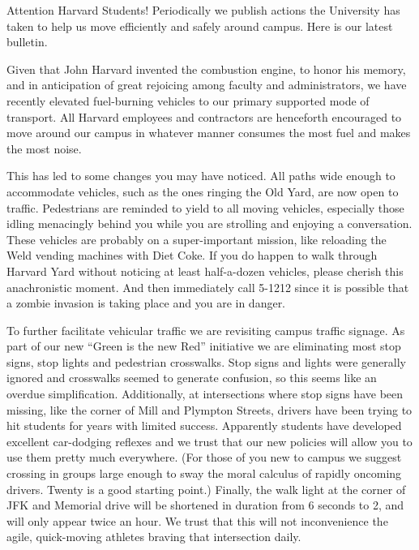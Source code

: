 
Attention Harvard Students! Periodically we publish actions the University
has taken to help us move efficiently and safely around campus. Here is our
latest bulletin.

Given that John Harvard invented the combustion engine, to honor his memory,
and in anticipation of great rejoicing among faculty and administrators, we
have recently elevated fuel-burning vehicles to our primary supported mode of
transport. All Harvard employees and contractors are henceforth encouraged to
move around our campus in whatever manner consumes the most fuel and makes
the most noise.

This has led to some changes you may have noticed. All paths wide enough to
accommodate vehicles, such as the ones ringing the Old Yard, are now open to
traffic. Pedestrians are reminded to yield to all moving vehicles, especially
those idling menacingly behind you while you are strolling and enjoying a
conversation. These vehicles are probably on a super-important mission, like
reloading the Weld vending machines with Diet Coke. If you do happen to walk
through Harvard Yard without noticing at least half-a-dozen vehicles, please
cherish this anachronistic moment. And then immediately call 5-1212 since it
is possible that a zombie invasion is taking place and you are in danger.

To further facilitate vehicular traffic we are revisiting campus traffic
signage. As part of our new ``Green is the new Red'' initiative we are
eliminating most stop signs, stop lights and pedestrian crosswalks. Stop
signs and lights were generally ignored and crosswalks seemed to generate
confusion, so this seems like an overdue simplification. Additionally, at
intersections where stop signs have been missing, like the corner of Mill and
Plympton Streets, drivers have been trying to hit students for years with
limited success. Apparently students have developed excellent car-dodging
reflexes and we trust that our new policies will allow you to use them pretty
much everywhere. (For those of you new to campus we suggest crossing in
groups large enough to sway the moral calculus of rapidly oncoming drivers.
Twenty is a good starting point.) Finally, the walk light at the corner of
JFK and Memorial drive will be shortened in duration from 6 seconds to 2, and
will only appear twice an hour. We trust that this will not inconvenience the
agile, quick-moving athletes braving that intersection daily.

